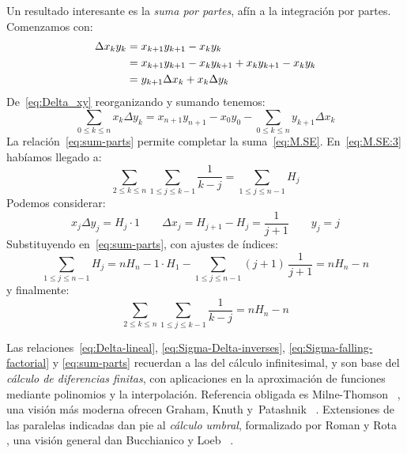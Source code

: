   Un resultado interesante es la \emph{suma por partes},%
  afín a la integración por partes.
  Comenzamos con:
  \begin{align}
    \Delta x_k y_k
      &= x_{k + 1} y_{k + 1} - x_k y_k \notag \\
      &= x_{k + 1} y_{k + 1}
	  - x_k y_{k + 1}
	  + x_k y_{k + 1}
	  - x_k y_k
	   \notag \\
      &= y_{k + 1} \Delta x_k + x_k \Delta y_k
	   \label{eq:Delta_xy}
  \end{align}
  De~\eqref{eq:Delta_xy} reorganizando y sumando tenemos:
  \begin{equation}
    \label{eq:sum-parts}
    \sum_{0 \le k \le n} x_k \Delta y_k
      = x_{n + 1} y_{n + 1} - x_0 y_0
	  - \sum_{0 \le k \le n} y_{k + 1} \Delta x_k
  \end{equation}
  La relación~\eqref{eq:sum-parts} permite
  completar la suma~\eqref{eq:M.SE}.
  En~\eqref{eq:M.SE:3} habíamos llegado a:
  \begin{equation*}
    \sum_{2 \le k \le n} \sum_{1 \le j \le k - 1} \frac{1}{k - j}
      = \sum_{1 \le j \le n - 1} H_j
  \end{equation*}
  Podemos considerar:
  \begin{equation*}
    x_j \Delta y_j
      = H_j \cdot 1
    \qquad
    \Delta x_j
      = H_{j + 1} - H_j = \frac{1}{j + 1}
    \qquad
    y_j
      = j
  \end{equation*}
  Substituyendo en~\eqref{eq:sum-parts},
  con ajustes de índices:
  \begin{equation*}
    \sum_{1 \le j \le n - 1} H_j
      = n H_n - 1 \cdot H_1
	  - \sum_{1 \le j \le n - 1} (j + 1) \, \frac{1}{j + 1}
      = n H_n - n
  \end{equation*}
  y finalmente:
  \begin{equation}
    \label{eq:M.SE:4}
    \sum_{2 \le k \le n} \sum_{1 \le j \le k - 1} \frac{1}{k - j}
      = n H_n - n
  \end{equation}

  Las relaciones~\eqref{eq:Delta-lineal},
  \eqref{eq:Sigma-Delta-inverses},
  \eqref{eq:Sigma-falling-factorial}
  y \eqref{eq:sum-parts}
  recuerdan a las del cálculo infinitesimal,
  y son base del \emph{cálculo de diferencias finitas},%
  con aplicaciones
  en la aproximación de funciones mediante polinomios
  y la interpolación.
  Referencia obligada es Milne-Thomson~%
    \cite{milne-thomson33:_calculus_finite_differences},
  una visión más moderna ofrecen Graham, Knuth y~Patashnik~%
    \cite{graham94:_concr_mathem}.
  Extensiones de las paralelas indicadas
  dan pie al \emph{cálculo umbral},
  formalizado por Roman y Rota~%
    \cite{roman78:_umbral_calculus},
  una visión general dan Bucchianico y Loeb~%
    \cite{bucchianico00:_survey_umbral_calculus}.

